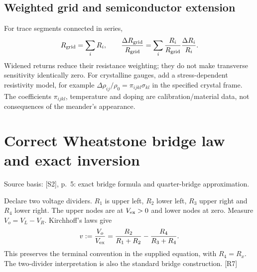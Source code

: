 \documentclass[10pt,a4paper]{article}
\numberwithin{equation}{section}
\newcommand{\src}[1]{\textcolor{muted}{\footnotesize Source basis: #1.}}
\newcommand{\newpart}{\clearpage}
\begin{document}
\subsection*{Weighted grid and semiconductor extension}
For trace segments connected in series,
\begin{equation}
R_{\rm grid}=\sum_iR_i,\qquad
\frac{\Delta R_{\rm grid}}{R_{\rm grid}}
=\sum_i\frac{R_i}{R_{\rm grid}}\frac{\Delta R_i}{R_i}.
\end{equation}
Widened returns reduce their resistance weighting; they do not make transverse sensitivity identically zero. For crystalline gauges, add a stress-dependent resistivity model, for example $\Delta\rho_{ij}/\rho_0=\pi_{ijkl}\sigma_{kl}$ in the specified crystal frame. The coefficients $\pi_{ijkl}$, temperature and doping are calibration/material data, not consequences of the meander's appearance.

\newpart
\section{Correct Wheatstone bridge law and exact inversion}
\label{sec:bridge}
\src{[S2], p.~5: exact bridge formula and quarter-bridge approximation}

Declare two voltage dividers. $R_1$ is upper left, $R_2$ lower left, $R_3$ upper right and $R_4$ lower right. The upper nodes are at $V_{\rm ex}>0$ and lower nodes at zero. Measure $V_o=V_L-V_R$. Kirchhoff's laws give
\begin{equation}
v:=\frac{V_o}{V_{\rm ex}}
=\frac{R_2}{R_1+R_2}-\frac{R_4}{R_3+R_4}.
\label{eq:bridge}
\end{equation}
This preserves the terminal convention in the supplied equation, with $R_4=R_x$. The two-divider interpretation is also the standard bridge construction. [R7]

\begin{center}
\end{center}
\end{document}
